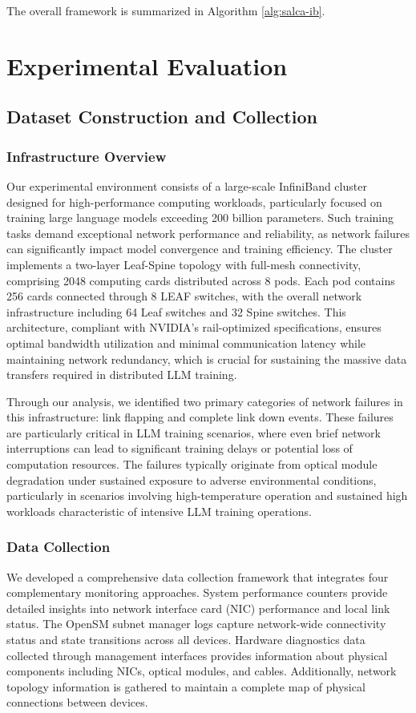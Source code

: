 \documentclass[conference]{IEEEtran}
\begin{document}
The overall framework is summarized in Algorithm \ref{alg:salca-ib}.



\section{Experimental Evaluation}

\subsection{Dataset Construction and Collection}

\subsubsection{Infrastructure Overview}
Our experimental environment consists of a large-scale InfiniBand cluster designed for high-performance computing workloads, particularly focused on training large language models exceeding 200 billion parameters. Such training tasks demand exceptional network performance and reliability, as network failures can significantly impact model convergence and training efficiency. The cluster implements a two-layer Leaf-Spine topology with full-mesh connectivity, comprising 2048 computing cards distributed across 8 pods. Each pod contains 256 cards connected through 8 LEAF switches, with the overall network infrastructure including 64 Leaf switches and 32 Spine switches. This architecture, compliant with NVIDIA's rail-optimized specifications, ensures optimal bandwidth utilization and minimal communication latency while maintaining network redundancy, which is crucial for sustaining the massive data transfers required in distributed LLM training.

Through our analysis, we identified two primary categories of network failures in this infrastructure: link flapping and complete link down events. These failures are particularly critical in LLM training scenarios, where even brief network interruptions can lead to significant training delays or potential loss of computation resources. The failures typically originate from optical module degradation under sustained exposure to adverse environmental conditions, particularly in scenarios involving high-temperature operation and sustained high workloads characteristic of intensive LLM training operations. 

\subsubsection{Data Collection}
We developed a comprehensive data collection framework that integrates four complementary monitoring approaches. System performance counters provide detailed insights into network interface card (NIC) performance and local link status. The OpenSM subnet manager logs capture network-wide connectivity status and state transitions across all devices. Hardware diagnostics data collected through management interfaces provides information about physical components including NICs, optical modules, and cables. Additionally, network topology information is gathered to maintain a complete map of physical connections between devices. 
\end{document}
